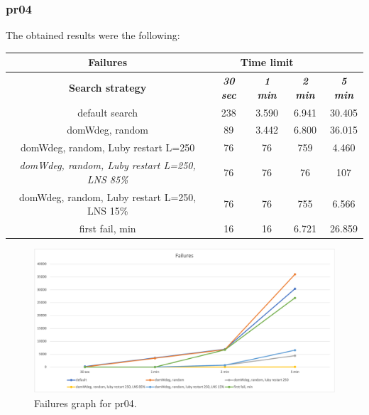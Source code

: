 \subsubsection{pr04}
The obtained results were the following:
{
\renewcommand{\arraystretch}{2}
\begin{longtable}[h]{| c | c | c | c | c |}
    \hline
    \textbf{Failures} & \multicolumn{3}{c}{Time limit} & \\
    \hline
    \textbf{Search strategy} & \textbf{\textit{30 sec}} & \textbf{\textit{1 min}} & \textbf{\textit{2 min}} & \textbf{\textit{5 min}} \\
    \hline
    \endhead
    default search                                         & 238 &  3.590 &  6.941 &  30.405 \\
    \hline
    domWdeg, random                                        &  89 &  3.442 &  6.800 &  36.015 \\
    \hline
    domWdeg, random, Luby restart L=250                    &  76 &    76 &   759 &   4.460 \\
    \hline
    \textit{domWdeg, random, Luby restart L=250, LNS 85\%} &  76 &    76 &    76 &    107 \\
    \hline
    domWdeg, random, Luby restart L=250, LNS 15\%          &  76 &    76 &   755 &   6.566 \\
    \hline
    first fail, min                                        &  16 &    16 &  6.721 &  26.859 \\
    \hline
\end{longtable}
}
\begin{figure}[H]
    \centering
    \includegraphics[width=1.0\columnwidth]{../graphs/pr04-failures.png}
    \caption{Failures graph for pr04.}
\end{figure}

